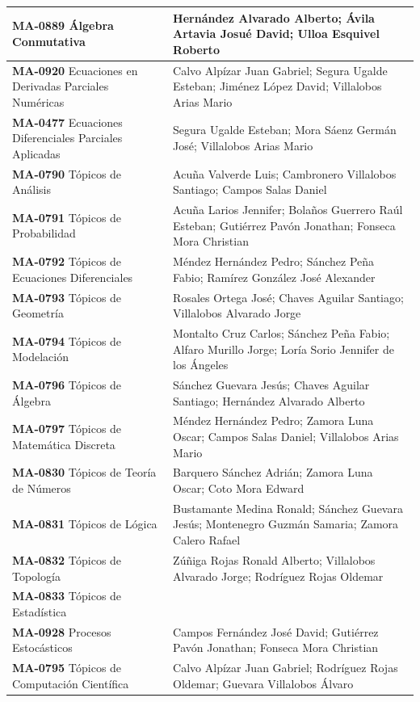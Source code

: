 \begin{longtable}{|>{\raggedright\arraybackslash}p{6.9cm}|>{\raggedright\arraybackslash}p{9.8cm}|}
\textbf{MA-0889} Álgebra Conmutativa & Hernández Alvarado Alberto; Ávila Artavia Josué David; Ulloa Esquivel Roberto \\ \hline
\textbf{MA-0920} Ecuaciones en Derivadas Parciales Numéricas & Calvo Alpízar Juan Gabriel; Segura Ugalde Esteban; Jiménez López David; Villalobos Arias Mario \\ \hline
\textbf{MA-0477} Ecuaciones Diferenciales Parciales Aplicadas & Segura Ugalde Esteban; Mora Sáenz Germán José; Villalobos Arias Mario \\ \hline
\textbf{MA-0790} Tópicos de Análisis & Acuña Valverde Luis; Cambronero Villalobos Santiago; Campos Salas Daniel \\ \hline
\textbf{MA-0791} Tópicos de Probabilidad & Acuña Larios Jennifer; Bolaños Guerrero Raúl Esteban; Gutiérrez Pavón Jonathan; Fonseca Mora Christian \\ \hline
\textbf{MA-0792} Tópicos de Ecuaciones Diferenciales & Méndez Hernández Pedro; Sánchez Peña Fabio; Ramírez González José Alexander \\ \hline
\textbf{MA-0793} Tópicos de Geometría & Rosales Ortega José; Chaves Aguilar Santiago; Villalobos Alvarado Jorge \\ \hline
\textbf{MA-0794} Tópicos de Modelación & Montalto Cruz Carlos; Sánchez Peña Fabio; Alfaro Murillo Jorge; Loría Sorio Jennifer de los Ángeles \\ \hline
\textbf{MA-0796} Tópicos de Álgebra & Sánchez Guevara Jesús; Chaves Aguilar Santiago; Hernández Alvarado Alberto \\ \hline
\textbf{MA-0797} Tópicos de Matemática Discreta & Méndez Hernández Pedro; Zamora Luna Oscar; Campos Salas Daniel; Villalobos Arias Mario \\ \hline
\textbf{MA-0830} Tópicos de Teoría de Números & Barquero Sánchez Adrián; Zamora Luna Oscar; Coto Mora Edward \\ \hline
\textbf{MA-0831} Tópicos de Lógica & Bustamante Medina Ronald; Sánchez Guevara Jesús; Montenegro Guzmán Samaria; Zamora Calero Rafael \\ \hline
\textbf{MA-0832} Tópicos de Topología & Zúñiga Rojas Ronald Alberto; Villalobos Alvarado Jorge; Rodríguez Rojas Oldemar \\ \hline
\textbf{MA-0833} Tópicos de Estadística &  \\ \hline
\textbf{MA-0928} Procesos Estocásticos & Campos Fernández José David; Gutiérrez Pavón Jonathan; Fonseca Mora Christian \\ \hline
\textbf{MA-0795} Tópicos de Computación Científica & Calvo Alpízar Juan Gabriel; Rodríguez Rojas Oldemar; Guevara Villalobos Álvaro \\ \hline

\end{longtable}
